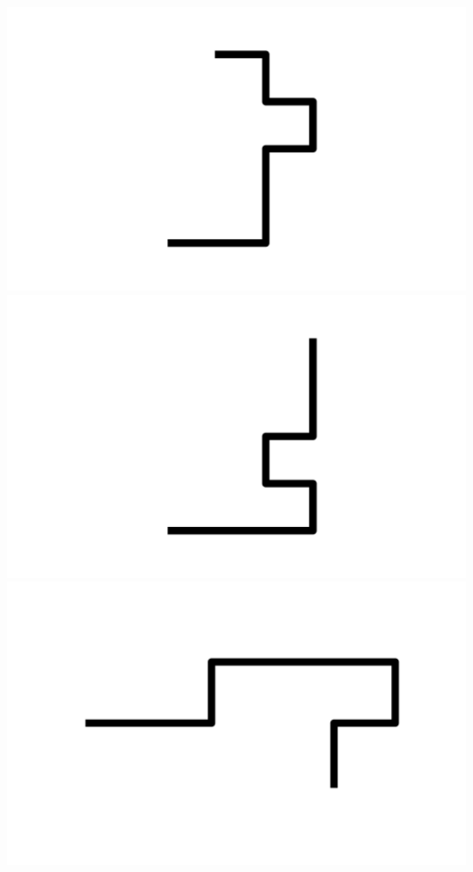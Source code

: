 \documentclass[]{report}
\begin{document}
\includegraphics[scale=.1]{pictures/21/state_cluster_shapes_103.pdf} 
\includegraphics[scale=.1]{pictures/21/state_cluster_shapes_104.pdf} 
\includegraphics[scale=.1]{pictures/21/state_cluster_shapes_105.pdf} 
\end{document}
